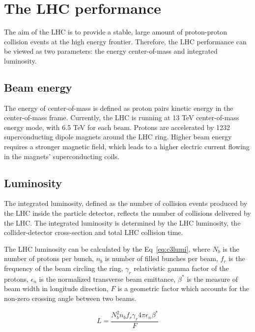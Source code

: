 \section{The LHC performance}
\label{sec:lhcs1}
\par The aim of the LHC is to provide a stable, large amount of proton-proton collision events at the high energy frontier. Therefore, the LHC performance can be viewed as two parameters: the energy center-of-mass and integrated luminosity.

\subsection{Beam energy}
\par The energy of center-of-mass is defined as proton pairs kinetic energy in the center-of-mass frame. Currently, the LHC is running at 13 TeV center-of-mass energy mode, with 6.5 TeV for each beam. Protons are accelerated by 1232 superconducting dipole magnets around the LHC ring. Higher beam energy requires a stronger magnetic field, which leads to a higher electric current flowing in the magnets' superconducting coils.

\subsection{Luminosity}
\par The integrated luminosity, defined as the number of collision events produced by the LHC inside the particle detector, reflects the number of collisions delivered by the LHC. The integrated luminosity is determined by the LHC luminosity, the collider-detector cross-section and total LHC collision time.

\par The LHC luminosity can be calculated by the Eq~\ref{eq:c3lumi}, where $N_{b}$ is the number of protons per bunch, $n_{b}$ is number of filled bunches per beam, $f_{r}$ is the frequency of the beam circling the ring, $\gamma_{r}$ relativistic gamma factor of the protons, $\epsilon_{n}$ is the normalized transverse beam emittance, $\beta^{*}$ is the measure of beam width in longitude direction, $F$ is a geometric factor which accounts for the non-zero crossing angle between two beams.

\begin{equation}
  L = \frac{N_{b}^{2}n_{b}f_{r}\gamma_{r}4\pi\epsilon_{n}\beta^{*}}{F}
  \label{eq:c3lumi}
\end{equation}

